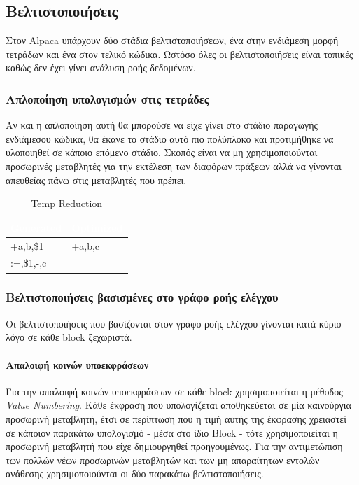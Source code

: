 \documentclass[12pt]{article}
\begin{document}
\subsection{Βελτιστοποιήσεις}
Στον Alpaca υπάρχουν δύο στάδια βελτιστοποιήσεων, ένα στην ενδιάμεση μορφή τετράδων και ένα στον τελικό κώδικα. Ωστόσο όλες οι βελτιστοποιήσεις είναι τοπικές καθώς δεν έχει γίνει ανάλυση ροής δεδομένων.
\subsubsection{Απλοποίηση υπολογισμών στις τετράδες}
Αν και η απλοποίηση αυτή θα μπορούσε να είχε γίνει στο στάδιο παραγωγής ενδιάμεσου κώδικα, θα έκανε το στάδιο αυτό πιο πολύπλοκο και προτιμήθηκε να υλοποιηθεί σε κάποιο επόμενο στάδιο. Σκοπός είναι να μη χρησιμοποιούνται προσωρινές μεταβλητές για την εκτέλεση των διαφόρων πράξεων αλλά να γίνονται απευθείας πάνω στις μεταβλητές που πρέπει.

\begin{table}
\centering
\begin{tabular}{|l|l|}
\hline
   \rowcolor{ablack}
    \textcolor{white}{Generated} & \textcolor{white}{Optimized} \\ \hline
    
    \rowcolor{gray}  
    +a,b,\$1 & +a,b,c \\ 
    \rowcolor{gray}    
    :=,\$1,-,c & \\
    
\hline
\end{tabular}
\caption{Temp Reduction}
\end{table}
\subsubsection{Βελτιστοποιήσεις βασισμένες στο γράφο ροής ελέγχου}
Οι βελτιστοποιήσεις που βασίζονται στον γράφο ροής ελέγχου γίνονται κατά κύριο λόγο σε κάθε block ξεχωριστά.
\paragraph{Απαλοιφή κοινών υποεκφράσεων}
Για την απαλοιφή κοινών υποεκφράσεων σε κάθε block χρησιμοποιείται η μέθοδος \textit{Value Numbering}. Κάθε έκφραση που υπολογίζεται αποθηκεύεται σε μία καινούργια προσωρινή μεταβλητή, έτσι σε περίπτωση που η τιμή αυτής της έκφρασης χρειαστεί σε κάποιον παρακάτω υπολογισμό - μέσα στο ίδιο Block - τότε χρησιμοποιείται η  προσωρινή μεταβλητή που είχε δημιουργηθεί προηγουμένως. Για την αντιμετώπιση των πολλών νέων προσωρινών μεταβλητών και των μη απαραίτητων εντολών ανάθεσης χρησιμοποιούνται οι δύο παρακάτω βελτιστοποιήσεις.
\end{document}
